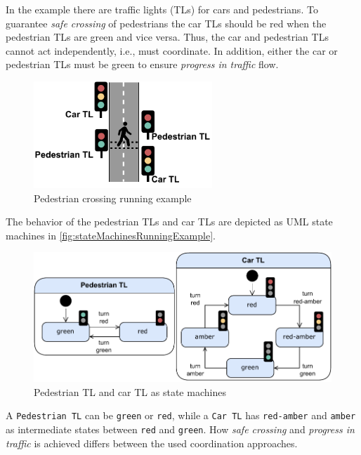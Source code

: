 \documentclass[runningheads]{llncs}
\begin{document}
In the example there are traffic lights (TLs) for cars and pedestrians.
To guarantee \textit{safe crossing} of pedestrians the car TLs should be red when the pedestrian TLs are green and vice versa.
Thus, the car and pedestrian TLs cannot act independently, i.e., must coordinate.
In addition, either the car or pedestrian TLs must be green to ensure \textit{progress in traffic} flow.

\begin{figure}[ht]
	\centering
	\includegraphics[width=0.6\textwidth]{images/running_example_schematic}
	\caption{Pedestrian crossing running example}
	\label{fig:overviewRunningExample}
\end{figure}

The behavior of the pedestrian TLs and car TLs are depicted as UML state machines \cite{objectmanagementgroupUnifiedModelingLanguage2017} in \autoref{fig:stateMachinesRunningExample}.

\begin{figure}[ht]
	\centering
	\includegraphics[width=1\textwidth]{images/running_example_models}
	\caption{Pedestrian TL and car TL as state machines}
	\label{fig:stateMachinesRunningExample}
\end{figure}

A \texttt{Pedestrian TL} can be \texttt{green} or \texttt{red}, while a \texttt{Car TL} has \texttt{red-amber} and \texttt{amber} as intermediate states between \texttt{red} and \texttt{green}.
How \textit{safe crossing} and \textit{progress in traffic} is achieved differs between the used coordination approaches.
\end{document}
